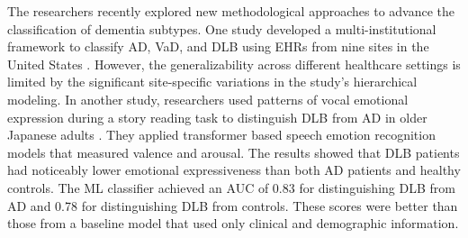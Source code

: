 The researchers recently explored new methodological approaches to advance the classification of dementia subtypes. One study developed a multi-institutional framework to classify AD, VaD, and DLB using EHRs from nine sites in the United States \cite{Sharma2024Leveraging}. However, the generalizability across different healthcare settings is limited by the significant site-specific variations in the study's hierarchical modeling. In another study, researchers used patterns of vocal emotional expression during a story reading task to distinguish DLB from AD in older Japanese adults \cite{Kobayashi2024Vocal}. They applied transformer based speech emotion recognition models that measured valence and arousal. The results showed that DLB patients had noticeably lower emotional expressiveness than both AD patients and healthy controls. The ML classifier achieved an AUC of 0.83 for distinguishing DLB from AD and 0.78 for distinguishing DLB from controls. These scores were better than those from a baseline model that used only clinical and demographic information.

